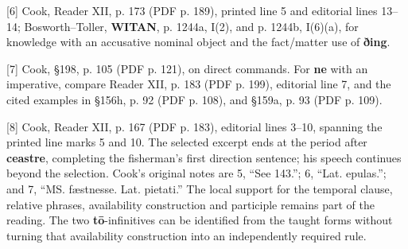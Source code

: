 [6] Cook, Reader XII, p. 173 (PDF p. 189), printed line 5 and editorial lines 13–14; Bosworth–Toller, \textbf{WITAN}, p. 1244a, I(2), and p. 1244b, I(6)(a), for knowledge with an accusative nominal object and the fact/\allowbreak{}matter use of \textbf{ðing}.

[7] Cook, §198, p. 105 (PDF p. 121), on direct commands. For \textbf{ne} with an imperative, compare Reader XII, p. 183 (PDF p. 199), editorial line 7, and the cited examples in §156h, p. 92 (PDF p. 108), and §159a, p. 93 (PDF p. 109).

[8] Cook, Reader XII, p. 167 (PDF p. 183), editorial lines 3–10, spanning the printed line marks 5 and 10. The selected excerpt ends at the period after \textbf{ceastre}, completing the fisherman’s first direction sentence; his speech continues beyond the selection. Cook’s original notes are 5, “See 143.”; 6, “Lat. epulas.”; and 7, “MS. fæstnesse. Lat. pietati.” The local support for the temporal clause, relative phrases, availability construction and participle remains part of the reading. The two \textbf{tō}-infinitives can be identified from the taught forms without turning that availability construction into an independently required rule.

\endgroup


